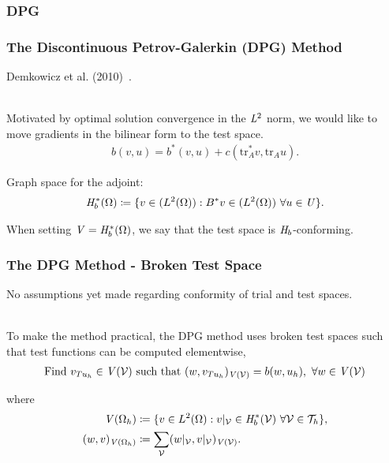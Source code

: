 \subsubsection{DPG}

\begin{frame}
\frametitle{The Discontinuous Petrov-Galerkin (DPG) Method}

Demkowicz et al. (2010)~\cite{Demkowicz2011}.
\\~

Motivated by optimal solution convergence in the $\mathit{{{L}}}^2$ norm, we would like
to move gradients in the bilinear form to the test space.
\begin{align}
b(v,u) = b^*(v,u) + c(\text{tr}_A^* v, \text{tr}_A u).
\end{align}

Graph space for the adjoint:
\begin{align}
\mathit{{{H}}}_b^*(\Omega) \coloneqq
\{ v \in (L^2(\Omega)) : B^*v \in (L^2(\Omega))\ \forall u \in \mathit{{{U}}} \}.
\end{align}

When setting $\mathit{{{V}}} = \mathit{{{H}}}_b^*(\Omega)$, we say that the test space
is $\mathit{{{H}}}_b$-conforming.

\end{frame}

\begin{frame}
\frametitle{The DPG Method - Broken Test Space}

No assumptions yet made regarding conformity of trial and test spaces.
\\~


To make the method practical, the DPG method uses broken test spaces such that
test functions can be computed elementwise,
\begin{align} \label{eq:auxiliary_opt_v_infinite}
\text{Find}\ v_{T u_h} \in \mathit{{{V}}}(\mathcal{{{V}}})\ \text{such that}\
(w,v_{T u_h})_{\mathit{{{V}}}(\mathcal{{{V}}})} = b(w,u_h),\ \forall w \in \mathit{{{V}}}(\mathcal{{{V}}})
\end{align}

where
\begin{align}
\mathit{{{V}}}(\Omega_h)
&\coloneqq
\{ v \in L^2(\Omega) : v|_{\mathcal{{{V}}}} \in \mathit{{{H}}}_b^*(\mathcal{{{V}}})\
   \forall \mathcal{{{V}}} \in \mathcal{T}_h \}, \\
(w,v)_{\mathit{{{V}}}(\Omega_h)}
&\coloneqq
\sum_{\mathcal{{{V}}}} (w|_{\mathcal{{{V}}}},v|_{\mathcal{{{V}}}})_{\mathit{{{V}}}(\mathcal{{{V}}})}.
\end{align}

\end{frame}

